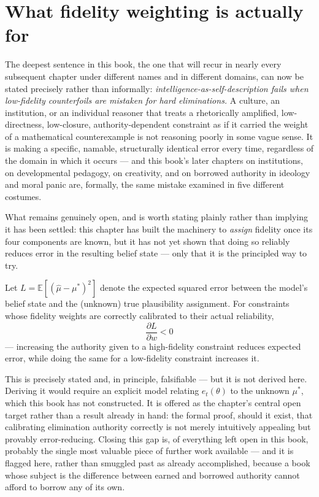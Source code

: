 \section{What fidelity weighting is actually for}

The deepest sentence in this book, the one that will recur in nearly every subsequent chapter under different names and in different domains, can now be stated precisely rather than informally: \emph{intelligence-as-self-description fails when low-fidelity counterfoils are mistaken for hard eliminations.} A culture, an institution, or an individual reasoner that treats a rhetorically amplified, low-directness, low-closure, authority-dependent constraint as if it carried the weight of a mathematical counterexample is not reasoning poorly in some vague sense. It is making a specific, namable, structurally identical error every time, regardless of the domain in which it occurs --- and this book's later chapters on institutions, on developmental pedagogy, on creativity, and on borrowed authority in ideology and moral panic are, formally, the same mistake examined in five different costumes.

What remains genuinely open, and is worth stating plainly rather than implying it has been settled: this chapter has built the machinery to \emph{assign} fidelity once its four components are known, but it has not yet shown that doing so reliably reduces error in the resulting belief state --- only that it is the principled way to try.

\begin{conjecture}
Let $L = \mathbb{E}[(\hat\mu - \mu^*)^2]$ denote the expected squared error between the model's belief state and the (unknown) true plausibility assignment. For constraints whose fidelity weights are correctly calibrated to their actual reliability,
\[
\frac{\partial L}{\partial w} < 0
\]
--- increasing the authority given to a high-fidelity constraint reduces expected error, while doing the same for a low-fidelity constraint increases it.
\end{conjecture}

This is precisely stated and, in principle, falsifiable --- but it is not derived here. Deriving it would require an explicit model relating $e_t(\theta)$ to the unknown $\mu^*$, which this book has not constructed. It is offered as the chapter's central open target rather than a result already in hand: the formal proof, should it exist, that calibrating elimination authority correctly is not merely intuitively appealing but provably error-reducing. Closing this gap is, of everything left open in this book, probably the single most valuable piece of further work available --- and it is flagged here, rather than smuggled past as already accomplished, because a book whose subject is the difference between earned and borrowed authority cannot afford to borrow any of its own.

